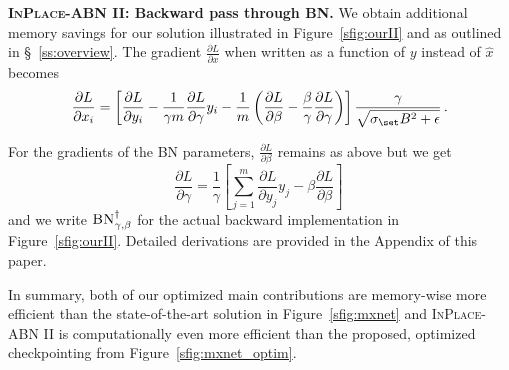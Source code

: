 \documentclass[10pt,twocolumn,letterpaper]{article}
\newcommand{\bnInplace}{\textsc{InPlace-ABN}\xspace}
\newcommand{\myparagraph}[1]{\vspace{5pt}\noindent\textbf{#1}}
\begin{document}
\myparagraph{\bnInplace II: Backward pass through \textsc{BN}.}
We obtain additional memory savings for our solution illustrated in Figure~\ref{sfig:ourII} and as outlined in \S~\ref{ss:overview}. The gradient $\frac{\partial L}{\partial x}$ when written as a function of $y$ instead of $\hat x$ becomes
\[
\frac{\partial L}{\partial x_i}=\left[\frac{\partial L}{\partial y_i}-\frac{1}{\gamma m}\frac{\partial L}{\partial \gamma}y_i-\frac{1}{m}\left(\frac{\partial L}{\partial \beta}-\frac{\beta}{\gamma}\frac{\partial L}{\partial \gamma}\right)\right]\frac{\gamma}{\sqrt{\sigma_\set B^2+\epsilon}}\,.
\]

For the gradients of the \textsc{BN} parameters, $\frac{\partial L}{\partial \beta}$ remains as above but we get 
\[
	\frac{\partial L}{\partial \gamma}=\frac{1}{\gamma}\left[\sum_{j=1}^m\frac{\partial L}{\partial y_j}y_j - \beta\frac{\partial L}{\partial \beta}\right]\,
\]
and we write $\textsc{BN}_{\gamma,\beta}^\dagger$ for the actual backward implementation in Figure~\ref{sfig:ourII}.
Detailed derivations are provided in the Appendix of this paper. 

In summary, both of our optimized main contributions are memory-wise more efficient than the state-of-the-art solution in Figure~\ref{sfig:mxnet} and \bnInplace II is computationally even more efficient than the proposed, optimized checkpointing from Figure~\ref{sfig:mxnet_optim}.



\end{document}
